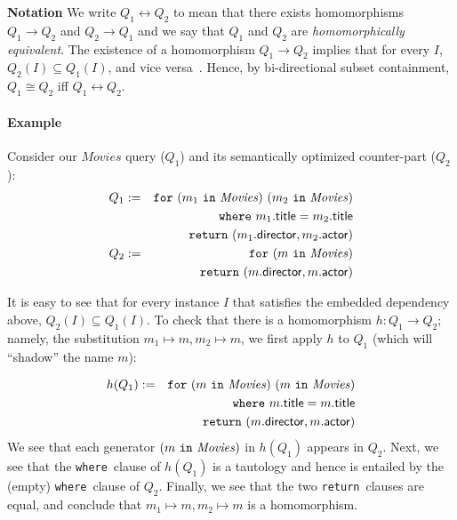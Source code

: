 \documentclass{sigplanconf}
\newcommand{\FOR}{{\tt for}\relax\ifmmode\ \else\xspace\fi}
\newcommand{\WHERE}{{\tt where}\relax\ifmmode\ \else\xspace\fi}
\newcommand{\IN}{ \ {\tt in} \ }
\newcommand{\RETURN}{{\tt return}\relax\ifmmode\ \else\xspace\fi}
\newcommand{\greg}[1]{\textcolor{blue}{GREG: #1}}
\newcommand{\relation}[1]{\ensuremath{\mathit{#1}}\xspace}
\begin{document}
{\bf Notation} We write $Q_1 \leftrightarrow Q_2$ to mean that there exists homomorphisms $Q_1 \to Q_2$ and $Q_2 \to Q_1$ and we say that $Q_1$ and $Q_2$ are {\it homomorphically equivalent}.  The existence of a homomorphism $Q_1 \to Q_2$ implies that for every $I$, $Q_2(I) \subseteq Q_1(I)$, and vice versa~\cite{foundations}.  Hence, by bi-directional subset containment, $Q_1 \cong Q_2$ iff $Q_1 \leftrightarrow Q_2$.

\paragraph{Example} Consider our \relation{Movies} query ($Q_1$) and its semantically optimized counter-part ($Q_2$):
\begin{eqnarray*}
Q_1 & := & \FOR (m_1 \IN \relation{Movies}) \ (m_2 \IN \relation{Movies}) \\
 & & \WHERE m_1.{\sf title} = m_2.{\sf title} \\
 & & \RETURN (m_1.{\sf director}, m_2.{\sf actor}) \\
Q_2 & := & \FOR (m \IN \relation{Movies}) \\
 & & \RETURN (m.{\sf director}, m.{\sf actor})
\end{eqnarray*}   

It is easy to see that for every instance $I$ that satisfies the embedded dependency above, $Q_2(I) \subseteq Q_1(I)$. 
To check that there is a homomorphism $h : Q_1 \to Q_2$; namely, the substitution $m_1 \mapsto m, m_2 \mapsto m$,
 we first apply $h$ to $Q_1$ (which will ``shadow'' the name $m$):

\begin{eqnarray*}
h(Q_1) & := & \FOR (m \IN \relation{Movies}) \ (m \IN \relation{Movies}) \\
 & & \WHERE m.{\sf title} = m.{\sf title} \\
 & & \RETURN (m.{\sf director}, m.{\sf actor})
\end{eqnarray*}   
We see that each generator $(m \IN \relation{Movies})$ in $h(Q_1)$ appears in $Q_2$.
Next, we see that the \WHERE clause of $h(Q_1)$ is a tautology and hence is entailed by the (empty) \WHERE clause of $Q_2$.
Finally, we see that the two \RETURN clauses are equal, and conclude that $m_1 \mapsto m, m_2 \mapsto m$ is a homomorphism.
\end{document}
